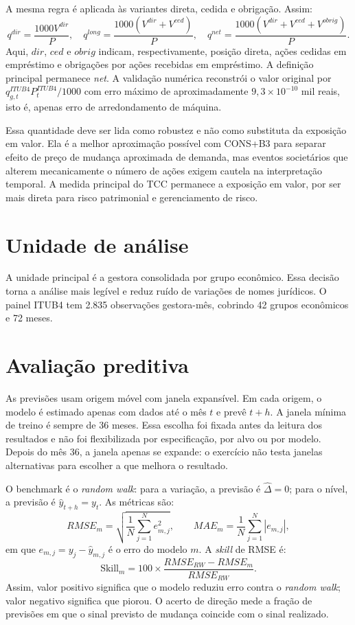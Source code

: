 \documentclass[12pt,a4paper]{report}
\begin{document}
A mesma regra é aplicada às variantes direta, cedida e obrigação. Assim:
\[
q^{dir}=\frac{1000V^{dir}}{P},\quad
q^{long}=\frac{1000(V^{dir}+V^{ced})}{P},\quad
q^{net}=\frac{1000(V^{dir}+V^{ced}+V^{obrig})}{P}.
\]
Aqui, $dir$, $ced$ e $obrig$ indicam, respectivamente, posição direta, ações cedidas em empréstimo e
obrigações por ações recebidas em empréstimo.
A definição principal permanece \emph{net}. A validação numérica reconstrói o valor original por
$q_{g,t}^{ITUB4}P_t^{ITUB4}/1000$ com erro máximo de aproximadamente $9{,}3\times10^{-10}$ mil reais, isto
é, apenas erro de arredondamento de máquina.

Essa quantidade deve ser lida como robustez e não como substituta da exposição em valor. Ela é a melhor
aproximação possível com CONS+B3 para separar efeito de preço de mudança aproximada de demanda, mas eventos
societários que alterem mecanicamente o número de ações exigem cautela na interpretação temporal. A medida
principal do TCC permanece a exposição em valor, por ser mais direta para risco patrimonial e gerenciamento
de risco.

\section{Unidade de análise}

A unidade principal é a gestora consolidada por grupo econômico. Essa decisão torna a análise mais legível e
reduz ruído de variações de nomes jurídicos. O painel ITUB4 tem 2.835 observações gestora-mês, cobrindo 42
grupos econômicos e 72 meses.

\section{Avaliação preditiva}

As previsões usam origem móvel com janela expansível. Em cada origem, o modelo é estimado apenas com dados
até o mês $t$ e prevê $t+h$. A janela mínima de treino é sempre de 36 meses. Essa escolha foi fixada antes
da leitura dos resultados e não foi flexibilizada por especificação, por alvo ou por modelo. Depois do mês
36, a janela apenas se expande: o exercício não testa janelas alternativas para escolher a que melhora o
resultado.

O benchmark é o \emph{random walk}: para a variação, a previsão é $\widehat{\Delta}=0$; para o nível, a
previsão é $\widehat{y}_{t+h}=y_t$. As métricas são:
\[
RMSE_m=\sqrt{\frac{1}{N}\sum_{j=1}^N e_{m,j}^2},\qquad
MAE_m=\frac{1}{N}\sum_{j=1}^N |e_{m,j}|,
\]
em que $e_{m,j}=y_j-\widehat{y}_{m,j}$ é o erro do modelo $m$. A \emph{skill} de RMSE é:
\[
\text{Skill}_{m}=100\times\frac{RMSE_{RW}-RMSE_m}{RMSE_{RW}}.
\]
Assim, valor positivo significa que o modelo reduziu erro contra o \emph{random walk}; valor negativo
significa que piorou. O acerto de direção mede a fração de previsões em que o sinal previsto de mudança
coincide com o sinal realizado.
\end{document}
